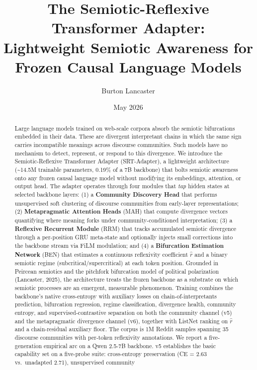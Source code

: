 \documentclass[
  11pt]{article}
\title{The Semiotic-Reflexive Transformer Adapter:\\
Lightweight Semiotic Awareness for Frozen Causal Language Models}
\author{Burton Lancaster}
\date{May 2026}
\begin{document}
\maketitle
\begin{abstract}
Large language models trained on web-scale corpora absorb the semiotic
bifurcations embedded in their data. These are divergent interpretant
chains in which the same sign carries incompatible meanings across
discourse communities. Such models have no mechanism to detect,
represent, or respond to this divergence. We introduce the
Semiotic-Reflexive Transformer Adapter (SRT-Adapter), a lightweight
architecture (\textasciitilde14.5M trainable parameters, 0.19\% of a 7B
backbone) that bolts semiotic awareness onto any frozen causal language
model without modifying its embeddings, attention, or output head. The
adapter operates through four modules that \emph{tap} hidden states at
selected backbone layers: (1) a \textbf{Community Discovery Head} that
performs unsupervised soft clustering of discourse communities from
early-layer representations; (2) \textbf{Metapragmatic Attention Heads}
(MAH) that compute divergence vectors quantifying where meaning forks
under community-conditioned interpretation; (3) a \textbf{Reflexive
Recurrent Module} (RRM) that tracks accumulated semiotic divergence
through a per-position GRU meta-state and optionally injects small
corrections into the backbone stream via FiLM modulation; and (4) a
\textbf{Bifurcation Estimation Network} (BEN) that estimates a
continuous reflexivity coefficient \(\hat{r}\) and a binary semiotic
regime (subcritical/supercritical) at each token position. Grounded in
Peircean semiotics and the pitchfork bifurcation model of political
polarization (Lancaster, 2025), the architecture treats the frozen
backbone as a substrate on which semiotic processes are an emergent,
measurable phenomenon. Training combines the backbone's native
cross-entropy with auxiliary losses on chain-of-interpretants
prediction, bifurcation regression, regime classification, divergence
health, community entropy, and supervised-contrastive separation on both
the community channel (v5) and the metapragmatic divergence channel
(v6), together with ListNet ranking on \(\hat{r}\) and a chain-residual
auxiliary floor. The corpus is 1M Reddit samples spanning 35 discourse
communities with per-token reflexivity annotations. We report a
five-generation empirical arc on a Qwen 2.5-7B backbone. v5 establishes
the basic capability set on a five-probe suite: cross-entropy
preservation (CE = 2.63 vs.~unadapted 2.71), unsupervised community

\end{abstract}
\end{document}
